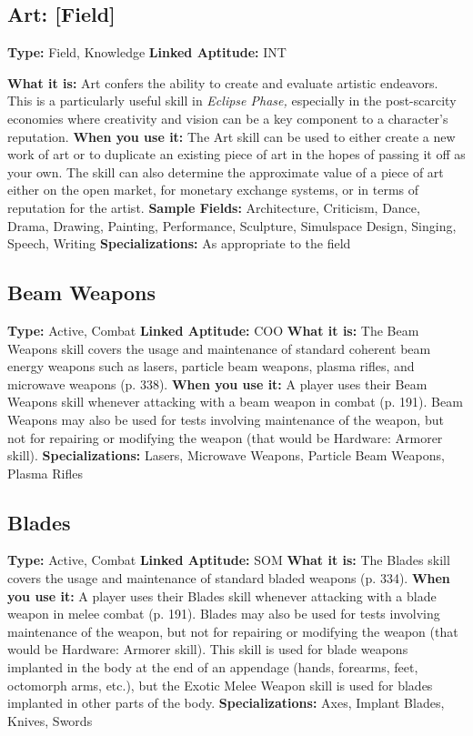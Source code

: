\subsection{Art: [Field]}

\textbf{Type: }Field, Knowledge
\textbf{Linked Aptitude:} INT

\textbf{What it is:} Art confers the ability to create and evaluate
artistic endeavors. This is a particularly useful
skill in \textit{Eclipse Phase,} especially in the post-scarcity 
economies where creativity and vision can be a key 
component to a character's reputation.
\textbf{When you use it:} The Art skill can be used to either 
create a new work of art or to duplicate an existing 
piece of art in the hopes of passing it off as your 
own. The skill can also determine the approximate 
value of a piece of art either on the open market, for 
monetary exchange systems, or in terms of reputation
for the artist.
\textbf{Sample Fields:} Architecture, Criticism, Dance, Drama, 
Drawing, Painting, Performance, Sculpture, Simulspace
Design, Singing, Speech, Writing
\textbf{Specializations:} As appropriate to the field

\subsection{Beam Weapons}

\textbf{Type:} Active, Combat
\textbf{Linked Aptitude:} COO
\textbf{What it is:} The Beam Weapons skill covers the usage 
and maintenance of standard coherent beam energy 
weapons such as lasers, particle beam weapons, 
plasma rifles, and microwave weapons (p. 338).
\textbf{When you use it:} A player uses their Beam Weapons
skill whenever attacking with a beam weapon in
combat (p. 191). Beam Weapons may also be used for 
tests involving maintenance of the weapon, but not 
for repairing or modifying the weapon (that would be 
Hardware: Armorer skill).
\textbf{Specializations:} Lasers, Microwave Weapons, Particle 
Beam Weapons, Plasma Rifles

\subsection{Blades}

\textbf{Type:} Active, Combat
\textbf{Linked Aptitude:} SOM
\textbf{What it is:} The Blades skill covers the usage and 
maintenance of standard bladed weapons (p. 334).
\textbf{When you use it:} A player uses their Blades skill 
whenever attacking with a blade weapon in melee 
combat (p. 191). Blades may also be used for tests 
involving maintenance of the weapon, but not for 
repairing or modifying the weapon (that would be 
Hardware: Armorer skill). This skill is used for blade 
weapons implanted in the body at the end of an appendage
(hands, forearms, feet, octomorph arms, etc.),
but the Exotic Melee Weapon skill is used for blades 
implanted in other parts of the body.
\textbf{Specializations:} Axes, Implant Blades, Knives, Swords

